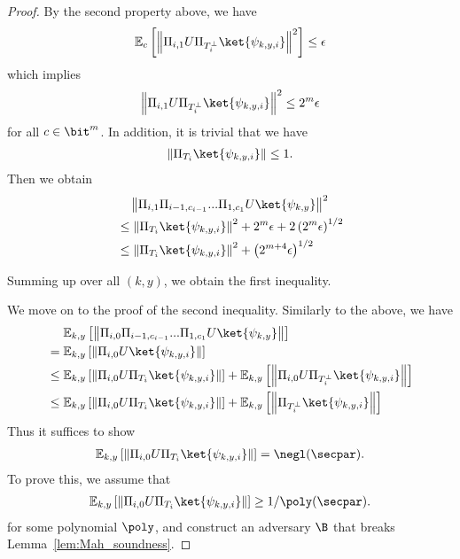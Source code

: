 \begin{proof}
By the second property above, we have
\begin{align*}
    \mathbb{E}_{c}\left[\left\|\Pi_{i,1}U\Pi_{T_i^\bot}\ket{\psi_{k,y,i}}\right\|^{2}\right]\leq \epsilon
\end{align*}
which implies 
\begin{align*}
    \left\|\Pi_{i,1}U\Pi_{T_i^\bot}\ket{\psi_{k,y,i}}\right\|^{2}\leq 2^{m}\epsilon
\end{align*}
for all $c\in \bit^{m}$.
In addition, it is trivial that we have
\begin{align*}
    \left\|\Pi_{T_i}\ket{\psi_{k,y,i}}\right\|\leq 1.
\end{align*}
Then we obtain
\begin{align*}
    &~~~\left\|\Pi_{i,1}\Pi_{i-1,c_{i-1}}...\Pi_{1,c_1}U\ket{\psi_{k,y}}\right\|^2\\
    &\leq  \left\|\Pi_{T_i}\ket{\psi_{k,y,i}}\right\|^2+2^{m}\epsilon+2\left(2^{m}\epsilon\right)^{1/2}\\
    &\leq \left\|\Pi_{T_i}\ket{\psi_{k,y,i}}\right\|^2+\left(2^{m+4}\epsilon\right)^{1/2}
\end{align*}

Summing up over all $(k,y)$, we obtain the first inequality.

We move on to the proof of the second inequality.
Similarly to the above, we have 
\begin{align*}
    &~~~~\mathbb{E}_{k,y}\left[\left\|\Pi_{i,0}\Pi_{i-1,c_{i-1}}...\Pi_{1,c_1}U\ket{\psi_{k,y}}\right\|\right]\\
    &=\mathbb{E}_{k,y}\left[\left\|\Pi_{i,0}U\ket{\psi_{k,y,i}}\right\|\right]\\
    &\leq \mathbb{E}_{k,y}\left[\left\|\Pi_{i,0}U\Pi_{T_i}\ket{\psi_{k,y,i}}\right\|\right]+\mathbb{E}_{k,y}\left[\left\|\Pi_{i,0}U\Pi_{T_i^\bot}\ket{\psi_{k,y,i}}\right\|\right]\\
    &\leq \mathbb{E}_{k,y}\left[\left\|\Pi_{i,0}U\Pi_{T_i}\ket{\psi_{k,y,i}}\right\|\right]+\mathbb{E}_{k,y}\left[\left\|\Pi_{T_i^\bot}\ket{\psi_{k,y,i}}\right\|\right]
\end{align*}
Thus it suffices to show 
\begin{align*}
   \mathbb{E}_{k,y}\left[\left\|\Pi_{i,0}U\Pi_{T_i}\ket{\psi_{k,y,i}}\right\|\right]=\negl(\secpar). 
\end{align*}
To prove this, we assume that 
\begin{align*}
   \mathbb{E}_{k,y}\left[\left\|\Pi_{i,0}U\Pi_{T_i}\ket{\psi_{k,y,i}}\right\|\right]\geq 1/\poly(\secpar). 
\end{align*}
for some polynomial $\poly$, and construct an adversary $\B$ that breaks Lemma~\ref{lem:Mah_soundness}.


\end{proof}
